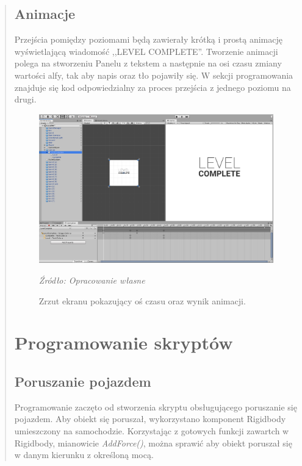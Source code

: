 \begin{quotation}
\subsection{Animacje}
\indent Przejścia pomiędzy poziomami będą zawierały krótką i prostą animację wyświetlającą wiadomość ,,LEVEL COMPLETE''. Tworzenie animacji polega na stworzeniu Panelu z tekstem a następnie na osi czasu zmiany wartości alfy, tak aby napis oraz tło pojawiły się. W sekcji programowania znajduje się kod odpowiedzialny za proces przejścia z jednego poziomu na drugi.


\begin{figure}[!hbt]
\centering
  \includegraphics[width=1\linewidth]{levelcomplete2.png}
  \caption{Zrzut ekranu pokazujący oś czasu oraz wynik animacji.}\label{rys_20}
  \begin{minipage}[t]{0.75\linewidth}
    \emph{Źródło: Opracowanie własne}
  \end{minipage}
\end{figure}


\newpage
\section{Programowanie skryptów}
\subsection{Poruszanie pojazdem}
\indent Programowanie zaczęto od stworzenia skryptu obsługującego poruszanie się pojazdem. Aby obiekt się poruszał, wykorzystano komponent Rigidbody umieszczony na samochodzie. Korzystając z gotowych funkcji zawartch w Rigidbody, mianowicie \textit{AddForce()}, można sprawić aby obiekt poruszał się w danym kierunku z określoną mocą. 


\end{quotation}
